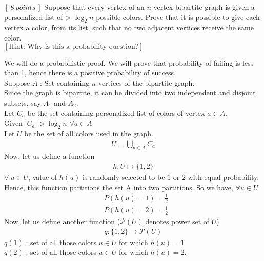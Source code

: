 \documentclass[12pt]{article}
\begin{document}
  \begin{question}
    $[\:8\:points\:]$ Suppose that every vertex of an $n$-vertex bipartite graph is given a personalized list of > $\log_2 n$ possible colors. Prove
    that it is possible to give each vertex a color, from its list, such that
    no two adjacent vertices receive the same color.\vspace{5pt} \\
    \indent $[\text{Hint: Why is this a probability question?}]$
  \end{question}
  
  \begin{solution}
  We will do a probabilistic proof. We will prove that probability of failing is less than 1, hence there is a positive probability of success.\\
  Suppose $A$ : Set containing $n$ vertices of the bipartite graph.\\
  Since the graph is bipartite, it can be divided into two independent and disjoint subsets, say $A_1$ and $A_2$.\\
  Let $C_a$ be the set containing personalized list of colors of vertex $a\in A$.\\
  Given $|C_a|>\log_2 n$ $\forall a\in A$ \\
  Let $U$ be the set of all colors used in the graph.
  \begin{align*}
      U = \bigcup_{a \in A} C_a
  \end{align*}
  Now, let us define a function 
  \begin{align*}
      h: U\mapsto \{1,2\}
  \end{align*} 
   $\forall \:u \in U$, value of $h(u)$ is randomly selected to be $1$ or $2$ with equal probability. Hence, this function partitions the set A into two partitions. So we have, $\forall u\in U$
  \begin{align*}
      &P\left(h(u) = 1\right) = \frac{1}{2} \\
      &P\left(h(u) = 2\right) = \frac{1}{2}
  \end{align*}
    Now, let us define another function ($\mathcal{P}(U)$ denotes power set of $U$)
    \begin{align*}
        q:\{1,2\} \mapsto \mathcal{P}(U)
    \end{align*}
    $q(1)$ : set of all those colors $u \in U$ for which $h(u) = 1$ \\
    $q(2)$ : set of all those colors $u \in U$ for which $h(u) = 2$. \\
    

\end{solution}
\end{document}
